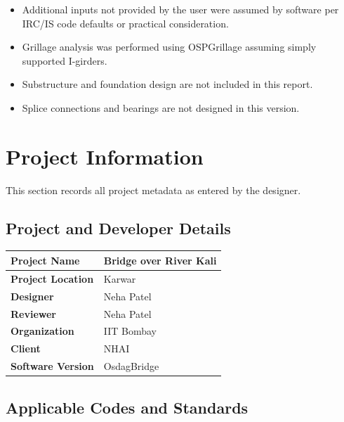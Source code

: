 \documentclass[12pt,a4paper]{report}
\numberwithin{table}{chapter}
\numberwithin{figure}{chapter}
\begin{document}
\begin{itemize}
\item Additional inputs not provided by the user were assumed by software per IRC/IS code defaults or practical consideration.
\item Grillage analysis was performed using OSPGrillage assuming simply supported I-girders.
\item Substructure and foundation design are not included in this report.
\item Splice connections and bearings are not designed in this version.
\end{itemize}

\titleformat{\chapter}[block]{\normalfont\Large\bfseries\centering}{\thechapter}{1em}{}
\titlespacing*{\chapter}{0pt}{-30pt}{10pt}


\chapter{Project Information}

This section records all project metadata as entered by the designer.

\section{Project and Developer Details}
\label{sec:project-details}

\begin{tabular}{|L{5.5cm}|L{8.5cm}|}
\hline
\textbf{Project Name} & Bridge over River Kali \\
\hline
\textbf{Project Location} & Karwar \\
\hline
\textbf{Designer} & Neha Patel \\
\hline
\textbf{Reviewer} & Neha Patel \\
\hline
\textbf{Organization} & IIT Bombay \\
\hline
\textbf{Client} & NHAI \\
\hline
\textbf{Software Version} & OsdagBridge \\
\hline
\end{tabular}


\section{Applicable Codes and Standards}
\label{sec:codes}
\end{document}
